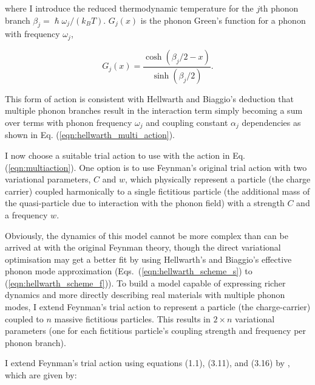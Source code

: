 where I introduce the reduced thermodynamic temperature for the $j$th phonon branch $\beta_j = \hslash \omega_j / (k_B T)$. $G_j(x)$ is the phonon Green's function for a phonon with frequency $\omega_j$, 

\begin{equation}
    G_j(x) = \frac{\cosh{(\beta_j/2-x)}}{\sinh{(\beta_j/2)}} .
\end{equation}

This form of action is consistent with Hellwarth and Biaggio's deduction that multiple phonon branches result in the interaction term simply becoming a sum over terms with phonon frequency $\omega_j$ and coupling constant $\alpha_j$ dependencies as shown in Eq. (\ref{eqn:hellwarth_multi_action}). 

I now choose a suitable trial action to use with the action in Eq. (\ref{eqn:multiaction}). One option is to use Feynman's original trial action with two variational parameters, $C$ and $w$, which physically represent a particle (the charge carrier) coupled harmonically to a single fictitious particle (the additional mass of the quasi-particle due to interaction with the phonon field) with a strength $C$ and a frequency $w$. 

Obviously, the dynamics of this model cannot be more complex than can be arrived at with the original Feynman theory, though the direct variational optimisation may get a better fit by using Hellwarth's and Biaggio's effective phonon mode approximation (Eqs.~(\ref{eqn:hellwarth_scheme_s}) to (\ref{eqn:hellwarth_scheme_f})).
To build a model capable of expressing richer dynamics and more directly describing real materials with multiple phonon modes, I extend Feynman's trial action to represent a particle (the charge-carrier) coupled to $n$ massive fictitious particles. This results in $2\times n$ variational parameters (one for each fictitious particle's coupling strength and frequency per phonon branch). 

I extend Feynman's trial action using equations (1.1), (3.11), and (3.16) by \cite{poulter_complete_1992}, which are given by:

